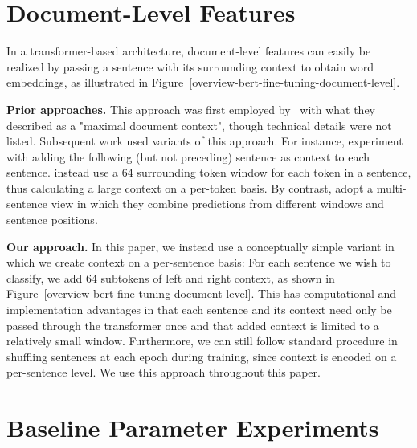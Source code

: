 \documentclass[11pt,a4paper]{article}
\begin{document}
\section{Document-Level Features}
\vspace{-2mm}

In a transformer-based architecture, document-level features can easily be realized by passing a sentence with its surrounding context to obtain word embeddings, as illustrated in Figure~\ref{overview-bert-fine-tuning-document-level}. 

\noindent
\textbf{Prior approaches.}
This approach was first employed by~\citet{devlin-etal-2019-bert} with what they described as a "maximal document context", though technical details were not listed. Subsequent work used variants of this approach. For instance, \citet{virtanen2019multilingual} experiment with adding the following (but not preceding) sentence as context to each sentence. \citet{yu-etal-2020-named} instead use a 64 surrounding token window for each token in a sentence, thus calculating a large context on a per-token basis. By contrast, \citet{luoma2020exploring} adopt a multi-sentence view in which they combine predictions from different windows and sentence positions.  


\noindent
\textbf{Our approach.}
In this paper, we instead use a conceptually simple variant in which we create context on a per-sentence basis: For each sentence we wish to classify, we add 64 subtokens of left and right context, as shown in Figure~\ref{overview-bert-fine-tuning-document-level}. This has computational and implementation advantages in that each sentence and its context need only be passed through the transformer once and that added context is limited to a relatively small window. Furthermore, we can still follow standard procedure in shuffling  sentences at each epoch during training, since context is encoded on a per-sentence level. We use this approach throughout this paper. 





















\section{Baseline Parameter Experiments}
\label{sec:baseline_experiments}
\vspace{-2mm}
\end{document}
